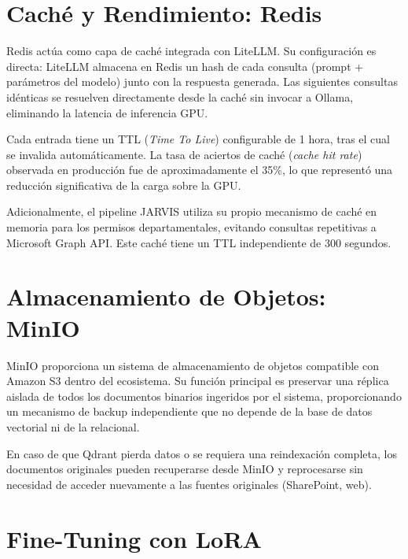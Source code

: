 \section{Caché y Rendimiento: Redis}
\label{sec:redis-impl}

Redis actúa como capa de caché integrada con LiteLLM. Su configuración es directa: LiteLLM almacena en Redis un hash de cada consulta (prompt + parámetros del modelo) junto con la respuesta generada. Las siguientes consultas idénticas se resuelven directamente desde la caché sin invocar a Ollama, eliminando la latencia de inferencia GPU.

Cada entrada tiene un TTL (\textit{Time To Live}) configurable de 1 hora, tras el cual se invalida automáticamente. La tasa de aciertos de caché (\textit{cache hit rate}) observada en producción fue de aproximadamente el 35\%, lo que representó una reducción significativa de la carga sobre la GPU.

Adicionalmente, el pipeline JARVIS utiliza su propio mecanismo de caché en memoria para los permisos departamentales, evitando consultas repetitivas a Microsoft Graph API. Este caché tiene un TTL independiente de 300 segundos.

\section{Almacenamiento de Objetos: MinIO}
\label{sec:minio-impl}

MinIO proporciona un sistema de almacenamiento de objetos compatible con Amazon S3 dentro del ecosistema. Su función principal es preservar una réplica aislada de todos los documentos binarios ingeridos por el sistema, proporcionando un mecanismo de backup independiente que no depende de la base de datos vectorial ni de la relacional.

En caso de que Qdrant pierda datos o se requiera una reindexación completa, los documentos originales pueden recuperarse desde MinIO y reprocesarse sin necesidad de acceder nuevamente a las fuentes originales (SharePoint, web).

\section{Fine-Tuning con LoRA}
\label{sec:finetuning-impl}

